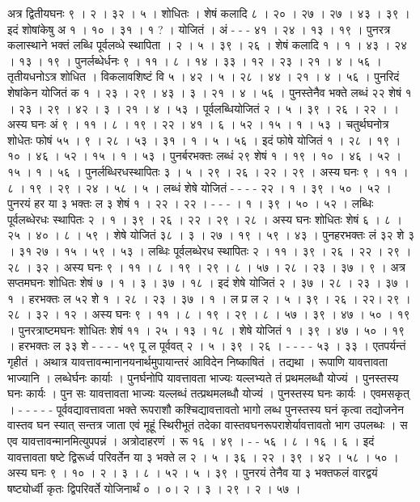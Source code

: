 \documentclass[11pt,a5paper]{book}
\begin{document}
\newpage 
{\s अत्र द्वितीयघनः ९ । २ । ३२ । ५ । शोधितः । शेषं कलादि ८ । २० । २७ । २७ । ४३ । ३९ । 
इदं शोषांकेषु अ १ । १० । ३१ । १ ? । योजितं । अं - - -  ४१ । २४ । १३ । १९ । 
पुनरत्र कलास्थाने भक्तं लब्धि पूर्वलव्धे स्थापिता । २ । ५ । ३९ । २६ ।
शेषं कलादि १ । १ । ४३ । २४ । १३ । १९ । पुनर्लब्धेर्धनः ९ । ११ । ८ । १४ । ३३ । १२ । २३ । २१ । ४ । ५६ । 
तृतीयधनोऽत्र शोधित । विकलावशिष्टं वि ५ । ४२ । ५ । २८ । ४४ । २१ । ४ । ५६ ।
पुनरिदं शेषांकेन योजितं क १ । २३ । २९ । ४३ । ३ । २१ । ४ । ५६ । 
पुनस्तेनैव भक्ते लब्धं २२ शेषं १ । २३ । २९ । ४२ । ३ । २१ । ४ । ५३ । 
पूर्वलब्धियोजितं  २ । ५ । ३९ । २६ । २२ । । 
अस्य घनः अं ९ । ११ । ८ । १९ । २२ । ४१ । ६ । ५२ । १५ । १ । ५३ । 
चतुर्थघनोत्र शोधेतः फोषं ५५ । ९ । २८ । ५३ । ३१ । १ । ५ । ५६ । 
इदं फोषे योजितं १ । २८ । १९ । १० । ४६ । ५२ । १५ । १ । ५३ । 
पुनर्बरभक्तः लब्धं २९ शेषं १ । १९ । १० । ४६ । ५२ । १५ । १ । ५६ । 
पुनर्लब्धिरधस्थापितः ३ । ५ । २९ । २६ । २२ । २९ । 
अस्य घनः ९  । ११ । ८ । १९ । २९ । २४ । ५८ । ५ । 
लब्धं शेषे योजितं - - - - २२ । १ । ३९ । ५० । ५२ । 
पुनरयं हर या ३ भक्तः ल ३ शेषं १ । २२ । २२ । - - - । १ । ३९ । ५० । ५२ । 
लब्धिः पूर्वलब्धेरधः स्थापितः २ । १ । ३९ । २६ । २२ । २९ । २८ । 
अस्य घनः शोधितः शेषं ६ । ८ । २५ । ४० । ८ । ५९ । 
शेषे योजितं ३८ । ३ । २७ । १९ । ५९ । ४३ । 
पुनहरभक्तः लं ३२ शे ३ । ३१  २७ । १५ । ५९ । ५३ । 
लब्धिः पूर्वलब्धेरध स्थापितः २ । ११ । ३९ । २६ । २२ । २९ । २८ । ३२ । 
अस्य घनः ९ । ११ । ८ । १९ । २९ । ८ । ५७ । २८ । २३ । ३७ । ९ । 
अत्र सप्तमघनः शोधितः शेषं ७ । १ । ३ । ३७ । १८ । 
इदं शेषे योजितं २ । ३७ । २८ । २३ । ३७ । १ । 
हरभक्तः ल ५२ शे १ । २८ । २३ । ३७ । १ । ल प्र ल २ । ५ । ३९ । २६ । २२। २९ । २८ । ३२ । १२ । 
अस्य घनः ९ । ११ । ८ । १९ । २९ । ८ । ५७ । ३९ । ४७ । ५० । १९ । 
पुनरत्राष्टमघनः शोधितः शेषं ११ । २५ । १३ । १८ । 
शेषे योजितं १ । ३९ । ४७ । ५० । १९ । 
हरभक्तः ल ३३ शे - - - - ५९ पू ल पूर्ववत् २ । ५ । ३९ । २६ । - - - - ५३ । ३३ । 
एतपर्यन्तं गृहीतं । अथात्र यावत्तावन्मानानयनार्थमुपायान्तरं आविदेन निष्काषितं । तद्यथा । 
रूपाणि यावत्तावता भाज्यानि । लब्धेर्घनः कार्याः । पुनर्घनोपि यावत्तावता भाज्यः यल्लभ्यते तं प्रथमलब्धौ योज्यं । 
पुनस्तस्य घनः कार्यः । पुन सः यावत्तावता भाज्यः यल्लब्धं तत्प्रथमलब्धौ योज्यं । पुनस्तस्य घनः कार्यः । 
एवमसकृत् । - - - - - पूर्ववद्यावत्तावता भक्ते रूपराशौ कश्चिद्यावत्तावतो भागो लब्ध
पुनस्तस्य घनं कृत्वा तद्योजनेन वास्तव घन स्यात् सन्तत्र जाता एवं मूहूं स्थिरीभूतं तदेका 
वास्तवघनरूपराशेर्यावत्तावतो भाग उपलब्धः । स एव यावत्तावन्मानमित्युपपन्नं । 
अत्रोदाहरणं । रू १६ । ४९ । - - ५६ । ८ । १६ । ६ । 
इदं यावत्तावता षष्टे द्विरूर्ध्व परिवर्तेन या ३ भक्ते ल २ । ५ । ३६ । २२ । ३९ । ४२ । ५८ । ५० । 
अस्य घनः ९ । १० । २ । ३ । ८ । ५२ । ५ । ३९ । 
पुनरयं तेनैव या ३ भक्तफलं वारद्वयं षष्ट्योर्ध्वी कृतः द्विपरिवर्ते योजिनार्थं ० । ०। २ । ३ । २९ । २ । ५७ । 
}
\end{document}
